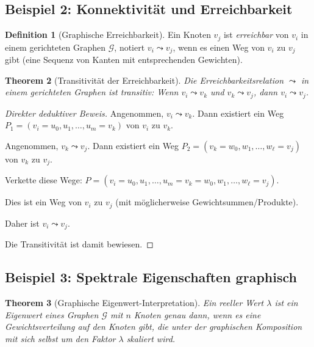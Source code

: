 \documentclass[12pt, a4paper]{article}
\newtheorem{theorem}{Theorem}[section]
\theoremstyle{definition}
\newtheorem{definition}[theorem]{Definition}
\theoremstyle{remark}
\newcommand{\Graph}{\mathcal{G}}
\begin{document}
\subsection{Beispiel 2: Konnektivität und Erreichbarkeit}
\label{subsec:beispiel_konnektivitaet}

\begin{definition}[Graphische Erreichbarkeit]
\label{def:erreichbarkeit}
Ein Knoten $v_j$ ist \emph{erreichbar} von $v_i$ in einem gerichteten Graphen $\Graph$, notiert $v_i \leadsto v_j$, wenn es einen Weg von $v_i$ zu $v_j$ gibt (eine Sequenz von Kanten mit entsprechenden Gewichten).
\end{definition}

\begin{theorem}[Transitivität der Erreichbarkeit]
\label{thm:erreichbarkeit_transitiv}
Die Erreichbarkeitsrelation $\leadsto$ in einem gerichteten Graphen ist transitiv: Wenn $v_i \leadsto v_k$ und $v_k \leadsto v_j$, dann $v_i \leadsto v_j$.
\end{theorem}

\begin{proof}[Direkter deduktiver Beweis]
Angenommen, $v_i \leadsto v_k$. Dann existiert ein Weg $P_1 = (v_i = u_0, u_1, \ldots, u_m = v_k)$ von $v_i$ zu $v_k$.

Angenommen, $v_k \leadsto v_j$. Dann existiert ein Weg $P_2 = (v_k = w_0, w_1, \ldots, w_\ell = v_j)$ von $v_k$ zu $v_j$.

Verkette diese Wege: $P = (v_i = u_0, u_1, \ldots, u_m = v_k = w_0, w_1, \ldots, w_\ell = v_j)$.

Dies ist ein Weg von $v_i$ zu $v_j$ (mit möglicherweise Gewichtsummen/Produkte).

Daher ist $v_i \leadsto v_j$.

Die Transitivität ist damit bewiesen.
\end{proof}

\subsection{Beispiel 3: Spektrale Eigenschaften graphisch}
\label{subsec:beispiel_spektral}

\begin{theorem}[Graphische Eigenwert-Interpretation]
\label{thm:graph_eigenwert}
Ein reeller Wert $\lambda$ ist ein Eigenwert eines Graphen $\Graph$ mit $n$ Knoten genau dann, wenn es eine Gewichtsverteilung auf den Knoten gibt, die unter der graphischen Komposition mit sich selbst um den Faktor $\lambda$ skaliert wird.
\end{theorem}
\end{document}
